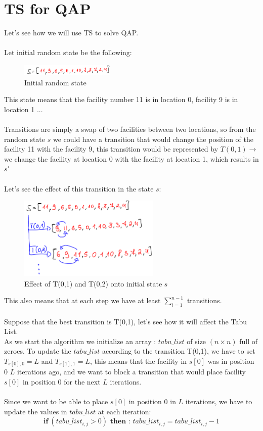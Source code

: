 \documentclass[a4paper]{article}
\begin{document}
\newpage
\section{TS for QAP}
Let's see how we will use TS to solve QAP.\\\\
Let initial random state be the following:
\begin{figure}[H]
\center
\includegraphics[width=0.4\textwidth]{images/state_image.PNG}
\caption{Initial random state}
\end{figure}
This state means that the facility number 11 is in location 0, facility 9 is in location 1 ... \\\\
Transitions are simply a swap of two facilities between two locations, so from the random state $s$ we could have a transition that would change the position of the facility 11 with the facility 9, this transition would be represented by $T(0,1) \longrightarrow$  we change the facility at location 0 with the facility at location 1, which results in $s'$\\\\
Let's see the effect of this transition in the state $s$:
\begin{figure}[H]
\center
\includegraphics[width=0.6\textwidth]{images/state_transition.PNG}
\caption{Effect of T(0,1) and T(0,2) onto initial state $s$}
\end{figure}
This also means that at each step we have at least $ \sum_{i=1}^{n-1} $ transitions.\\\\
Suppose that the best transition is T(0,1), let's see how it will affect the Tabu List.\\
As we start the algorithm we initialize an array : $tabu\_list$ of size $(n \times n)$ full of zeroes. To update the $tabu\_list$ according to the transition T(0,1), we have to set $T_{s[0],0} = L$ and $T_{s[1],1} = L$, this means that the facility in $s[0]$ was in position $0$ $L$ iterations ago, and we want to block a transition that would place facility $s[0]$ in position $0$ for the next $L$ iterations.\\\\
Since we want to be able to place $s[0]$ in position $0$ in $L$ iterations, we have to update the values in $tabu\_list$ at each iteration: $$\textbf{if}\ (tabu\_list_{i,j} > 0) \textbf{ then : } tabu\_list_{i,j} = tabu\_list_{i,j} - 1 $$\\
\end{document}
